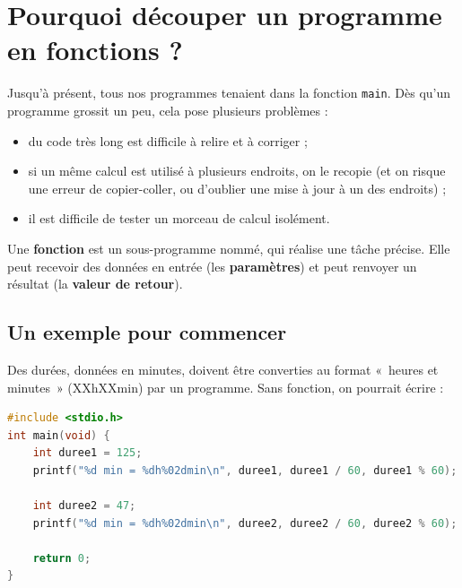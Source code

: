 \section{Pourquoi découper un programme en fonctions ?}

Jusqu'à présent, tous nos programmes tenaient dans la fonction \texttt{main}. Dès qu'un programme grossit un peu, cela pose plusieurs problèmes :
\begin{itemize}
  \item du code très long est difficile à relire et à corriger ;
  \item si un même calcul est utilisé à plusieurs endroits, on le recopie (et on risque une erreur de copier-coller, ou d'oublier une mise à jour à un des endroits) ;
  \item il est difficile de tester un morceau de calcul isolément.
\end{itemize}


Une \textbf{fonction} est un sous-programme nommé, qui réalise une tâche précise. Elle peut recevoir des données en entrée (les \textbf{paramètres}) et peut renvoyer un résultat (la \textbf{valeur de retour}).

\subsection{Un exemple pour commencer}

Des durées, données en minutes, doivent être converties au format « heures et minutes » (XXhXXmin) par un programme. Sans fonction, on pourrait écrire :

\begin{lstlisting}[language=c,caption={Conversion sans fonction},label=codeSansFonction]
#include <stdio.h>
int main(void) {
    int duree1 = 125;
    printf("%d min = %dh%02dmin\n", duree1, duree1 / 60, duree1 % 60);

    int duree2 = 47;
    printf("%d min = %dh%02dmin\n", duree2, duree2 / 60, duree2 % 60);

    return 0;
}
\end{lstlisting}

